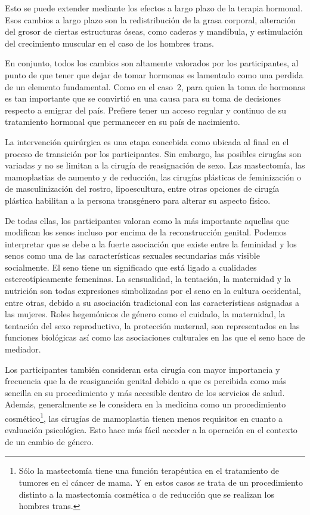 Esto se puede extender mediante los efectos a largo plazo de la terapia
hormonal. Esos cambios a largo plazo son la redistribución de la grasa corporal,
alteración del grosor de ciertas estructuras óseas, como caderas y mandíbula, y
estimulación del crecimiento muscular en el caso de los hombres trans.

En conjunto, todos los cambios son altamente valorados por los participantes, al
punto de que tener que dejar de tomar hormonas es lamentado como una perdida de
un elemento fundamental. Como en el caso~2, para quien la toma de hormonas es
tan importante que se convirtió en una causa para su toma de decisiones respecto
a emigrar del país. Prefiere tener un acceso regular y continuo de su
tratamiento hormonal que permanecer en su país de nacimiento.

La intervención quirúrgica es una etapa concebida como ubicada al final en el
proceso de transición por los participantes. Sin embargo, las posibles cirugías
son variadas y no se limitan a la cirugía de reasignación de sexo. Las
mastectomía, las mamoplastias de aumento y de reducción, las cirugías plásticas
de feminización o de masculinización del rostro, lipoescultura, entre otras
opciones de cirugía plástica habilitan a la persona transgénero para alterar su
aspecto físico.

De todas ellas, los participantes valoran como la más importante aquellas que
modifican los senos incluso por encima de la reconstrucción genital. Podemos
interpretar que se debe a la fuerte asociación que existe entre la feminidad y
los senos como una de las características sexuales secundarias más visible
socialmente. El seno tiene un significado que está ligado a cualidades
estereotípicamente femeninas. La sensualidad, la tentación, la maternidad y la
nutrición son todas expresiones simbolizadas por el seno en la cultura
occidental, entre otras, debido a su asociación tradicional con las
características asignadas a las mujeres. Roles hegemónicos de género como el
cuidado, la maternidad, la tentación del sexo reproductivo, la protección
maternal, son representados en las funciones biológicas así como las
asociaciones culturales en las que el seno hace de mediador.

Los participantes también consideran esta cirugía con mayor importancia y
frecuencia que la de reasignación genital debido a que es percibida como más
sencilla en su procedimiento y más accesible dentro de los servicios de salud.
Además, generalmente se le considera en la medicina como un procedimiento
cosmético\footnote{Sólo la mastectomía tiene una función terapéutica en el
tratamiento de tumores en el cáncer de mama. Y en estos casos se trata de un
procedimiento distinto a la mastectomía cosmética o de reducción que se realizan
los hombres trans.}, las cirugías de mamoplastia tienen menos requisitos en
cuanto a evaluación psicológica. Esto hace más fácil acceder a la operación en
el contexto de un cambio de género.

